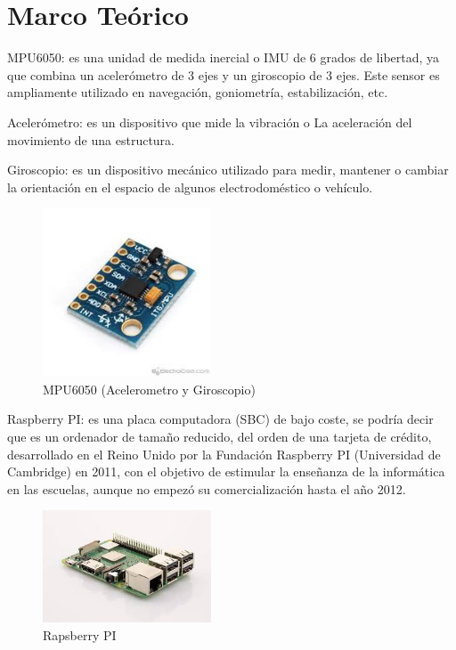 \section{Marco Teórico} \label{sec:marcoteorico}
MPU6050: es una unidad de medida inercial o IMU de 6
grados de libertad, ya que combina un acelerómetro de 3 ejes
y un giroscopio de 3 ejes. Este sensor es ampliamente utilizado en
navegación, goniometría, estabilización, etc.

Acelerómetro: es un dispositivo que mide la vibración o
La aceleración del movimiento de una estructura.

Giroscopio: es un dispositivo mecánico utilizado para medir,
mantener o cambiar la orientación en el espacio de algunos
electrodoméstico o vehículo. 
\begin{figure}[htbp]
\centering
\includegraphics[width=5cm]{Figuras/acelerometro}
\caption{MPU6050 (Acelerometro y Giroscopio)}
\label{fig:acelerometro}
\end{figure}

Raspberry PI: es una placa computadora (SBC) de bajo coste, se podría decir que es un ordenador de tamaño reducido, del orden de una tarjeta de crédito, desarrollado en el Reino Unido por la Fundación Raspberry PI (Universidad de Cambridge) en 2011, con el objetivo de estimular la enseñanza de la informática en las escuelas, aunque no empezó su comercialización hasta el año 2012. \cite{vujovic2015raspberry}

\begin{figure}[htbp]
\centering
\includegraphics[width=5cm]{Figuras/rapsberry}
\caption{Rapsberry PI}
\label{fig:rapsberry}
\end{figure}

